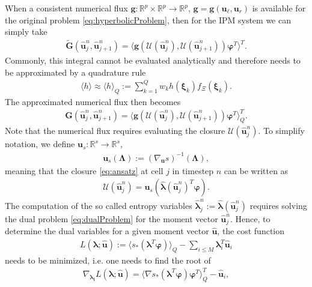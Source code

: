 When a consistent numerical flux $\bm g:\mathbb{R}^p\times\mathbb{R}^p\to\mathbb{R}^p$, $\bm g = \bm g(\bm u_\ell, \bm u_r)$ is available for the original problem \eqref{eq:hyperbolicProblem}, then for the IPM system we can simply take
\begin{align*}
 \bm{\tilde G}(\bm{\hat u}_{j}^n,\bm{\hat u}_{j+1}^{n}) = \langle \bm g(\mathcal{U}(\bm{\hat u}_j^n),\mathcal{U}(\bm{\hat u}_{j+1}^n))\bm{\varphi}^T\rangle^T.
\end{align*}
Commonly, this integral cannot be evaluated analytically and therefore needs to be approximated by a quadrature rule
\begin{align*}
\langle h \rangle \approx \langle h \rangle_{Q} := \sum_{k=1}^Q w_k h(\bm{\xi}_k)f_{\Xi}(\bm{\xi}_k).
\end{align*}
The approximated numerical flux then becomes
\begin{align}\label{eq:numericalFluxIPM}
 \bm{G}(\bm{\hat u}_{j}^n,\bm{\hat u}_{j+1}^{n}) = \langle \bm g(\mathcal{U}(\bm{\hat u}_j^n),\mathcal{U}(\bm{\hat u}_{j+1}^n))\bm{\varphi}^T\rangle^T_Q.
\end{align}
Note that the numerical flux requires evaluating the closure $\mathcal{U}(\bm{\hat u}_j^n)$. To simplify notation, we define $\bm{u}_{s}:\mathbb{R}^s \to \mathbb{R}^s$,
\begin{align*}
\bm{u}_{s}(\bm\Lambda):=\left( \nabla_{\bm{u}} s \right)^{-1}(\bm\Lambda),
\end{align*}
meaning that the closure \eqref{eq:ansatz} at cell $j$ in timestep $n$ can be written as
\begin{align*}
\mathcal{U}(\bm{\hat u}_j^n) = \bm{u}_{s}(\bm{\hat{\lambda}}(\bm{\hat u}_j^n)^T \bm{\varphi}).
\end{align*}
The computation of the so called entropy variables $\bm{\hat\lambda}_j^n:=\bm{\hat\lambda}(\bm{\hat u}_j^n)$ requires solving the dual problem \eqref{eq:dualProblem} for the moment vector $\bm{\hat u}_{j}^{n}$. Hence, to determine the dual variables for a given moment vector $\bm{\hat{u}}$, the cost function
\begin{align*}
L(\bm{\lambda};\bm{\hat{u}}) := \langle s_*(\bm{\lambda}^T \bm\varphi)\rangle_Q - \sum_{i\leq M}\bm{\lambda}_i^T \bm{\hat u}_i
\end{align*}
needs to be minimized, i.e. one needs to find the root of
\begin{align*}
\nabla_{\bm{\lambda_i}}L(\bm{\lambda};\bm{\hat{u}}) = \langle \nabla s_*(\bm{\lambda}^T \bm\varphi)\bm\varphi^T\rangle_Q^T - \bm{\hat u}_i,
\end{align*}
